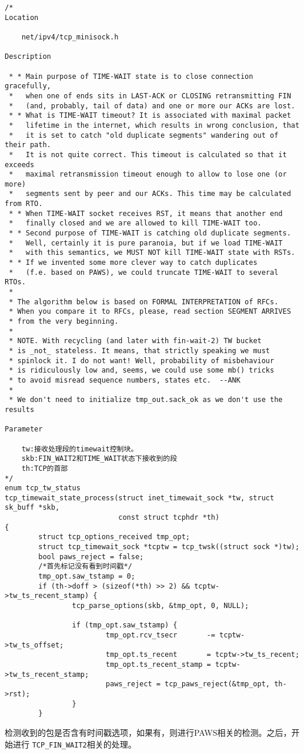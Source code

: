 \begin{verbatim}
/*
Location

	net/ipv4/tcp_minisock.h

Description

 * * Main purpose of TIME-WAIT state is to close connection gracefully,
 *   when one of ends sits in LAST-ACK or CLOSING retransmitting FIN
 *   (and, probably, tail of data) and one or more our ACKs are lost.
 * * What is TIME-WAIT timeout? It is associated with maximal packet
 *   lifetime in the internet, which results in wrong conclusion, that
 *   it is set to catch "old duplicate segments" wandering out of their path.
 *   It is not quite correct. This timeout is calculated so that it exceeds
 *   maximal retransmission timeout enough to allow to lose one (or more)
 *   segments sent by peer and our ACKs. This time may be calculated from RTO.
 * * When TIME-WAIT socket receives RST, it means that another end
 *   finally closed and we are allowed to kill TIME-WAIT too.
 * * Second purpose of TIME-WAIT is catching old duplicate segments.
 *   Well, certainly it is pure paranoia, but if we load TIME-WAIT
 *   with this semantics, we MUST NOT kill TIME-WAIT state with RSTs.
 * * If we invented some more clever way to catch duplicates
 *   (f.e. based on PAWS), we could truncate TIME-WAIT to several RTOs.
 *
 * The algorithm below is based on FORMAL INTERPRETATION of RFCs.
 * When you compare it to RFCs, please, read section SEGMENT ARRIVES
 * from the very beginning.
 *
 * NOTE. With recycling (and later with fin-wait-2) TW bucket
 * is _not_ stateless. It means, that strictly speaking we must
 * spinlock it. I do not want! Well, probability of misbehaviour
 * is ridiculously low and, seems, we could use some mb() tricks
 * to avoid misread sequence numbers, states etc.  --ANK
 *
 * We don't need to initialize tmp_out.sack_ok as we don't use the results

Parameter

	tw:接收处理段的timewait控制块。
	skb:FIN_WAIT2和TIME_WAIT状态下接收到的段
	th:TCP的首部
*/
enum tcp_tw_status
tcp_timewait_state_process(struct inet_timewait_sock *tw, struct sk_buff *skb,
                           const struct tcphdr *th)
{
        struct tcp_options_received tmp_opt;
        struct tcp_timewait_sock *tcptw = tcp_twsk((struct sock *)tw);
        bool paws_reject = false;
		/*首先标记没有看到时间戳*/
        tmp_opt.saw_tstamp = 0;
        if (th->doff > (sizeof(*th) >> 2) && tcptw->tw_ts_recent_stamp) {
                tcp_parse_options(skb, &tmp_opt, 0, NULL);

                if (tmp_opt.saw_tstamp) {
                        tmp_opt.rcv_tsecr       -= tcptw->tw_ts_offset;
                        tmp_opt.ts_recent       = tcptw->tw_ts_recent;
                        tmp_opt.ts_recent_stamp = tcptw->tw_ts_recent_stamp;
                        paws_reject = tcp_paws_reject(&tmp_opt, th->rst);
                }
        }
\end{verbatim}
	检测收到的包是否含有时间戳选项，如果有，则进行PAWS相关的检测。之后，开始进行
	\texttt{TCP_FIN_WAIT2}相关的处理。

